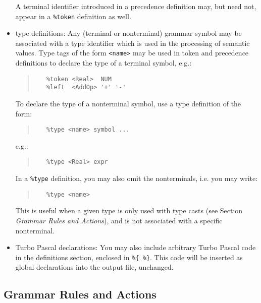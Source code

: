 \begin{itemize}
      A terminal identifier introduced in a precedence definition may, but
      need not, appear in a \verb"%token" definition as well.
   \item
      type definitions: Any (terminal or nonterminal) grammar symbol may be
      associated with a type identifier which is used in the processing of
      semantic values. Type tags of the form \verb"<name>" may be used in
      token and precedence definitions to declare the type of a terminal
      symbol, e.g.:
      \begin{quote}\begin{verbatim}
   %token <Real>  NUM
   %left  <AddOp> '+' '-'
      \end{verbatim}\end{quote}

      To declare the type of a nonterminal symbol, use a type definition of
      the form:
      \begin{quote}\begin{verbatim}
   %type <name> symbol ...
      \end{verbatim}\end{quote}
      e.g.:
      \begin{quote}\begin{verbatim}
   %type <Real> expr
      \end{verbatim}\end{quote}

      In a \verb"%type" definition, you may also omit the nonterminals, i.e.
      you may write:
      \begin{quote}\begin{verbatim}
   %type <name>
      \end{verbatim}\end{quote}

      This is useful when a given type is only used with type casts (see
      Section {\em Grammar Rules and Actions\/}), and is not associated with
      a specific nonterminal.
   \item
      Turbo Pascal declarations: You may also include arbitrary Turbo Pascal
      code in the definitions section, enclosed in \verb"%{ %}". This code
      will be inserted as global declarations into the output file, unchanged.
\end{itemize}

\subsection{Grammar Rules and Actions}

